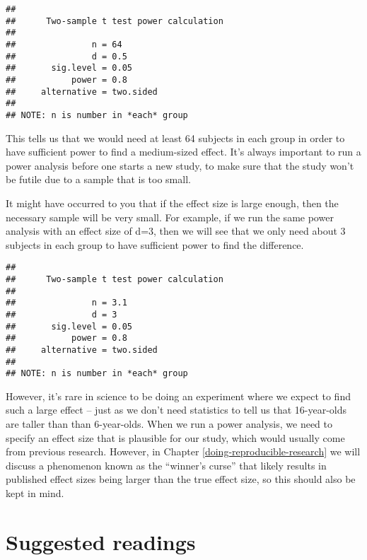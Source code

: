 \documentclass[]{book}
\newenvironment{Shaded}{\begin{snugshade}}{\end{snugshade}}
\newcommand{\KeywordTok}[1]{\textcolor[rgb]{0.13,0.29,0.53}{\textbf{#1}}}
\newcommand{\DataTypeTok}[1]{\textcolor[rgb]{0.13,0.29,0.53}{#1}}
\newcommand{\FloatTok}[1]{\textcolor[rgb]{0.00,0.00,0.81}{#1}}
\newcommand{\CommentTok}[1]{\textcolor[rgb]{0.56,0.35,0.01}{\textit{#1}}}
\newcommand{\NormalTok}[1]{#1}
\theoremstyle{definition}
\theoremstyle{definition}
\theoremstyle{definition}
\theoremstyle{remark}
\begin{document}
\begin{Shaded}
\end{Shaded}

\begin{verbatim}
## 
##      Two-sample t test power calculation 
## 
##               n = 64
##               d = 0.5
##       sig.level = 0.05
##           power = 0.8
##     alternative = two.sided
## 
## NOTE: n is number in *each* group
\end{verbatim}

This tells us that we would need at least 64 subjects in each group in
order to have sufficient power to find a medium-sized effect. It's
always important to run a power analysis before one starts a new study,
to make sure that the study won't be futile due to a sample that is too
small.

It might have occurred to you that if the effect size is large enough,
then the necessary sample will be very small. For example, if we run the
same power analysis with an effect size of d=3, then we will see that we
only need about 3 subjects in each group to have sufficient power to
find the difference.

\begin{verbatim}
## 
##      Two-sample t test power calculation 
## 
##               n = 3.1
##               d = 3
##       sig.level = 0.05
##           power = 0.8
##     alternative = two.sided
## 
## NOTE: n is number in *each* group
\end{verbatim}

However, it's rare in science to be doing an experiment where we expect
to find such a large effect -- just as we don't need statistics to tell
us that 16-year-olds are taller than than 6-year-olds. When we run a
power analysis, we need to specify an effect size that is plausible for
our study, which would usually come from previous research. However, in
Chapter \ref{doing-reproducible-research} we will discuss a phenomenon
known as the ``winner's curse'' that likely results in published effect
sizes being larger than the true effect size, so this should also be
kept in mind.

\section{Suggested readings}\label{suggested-readings-7}
\end{document}
